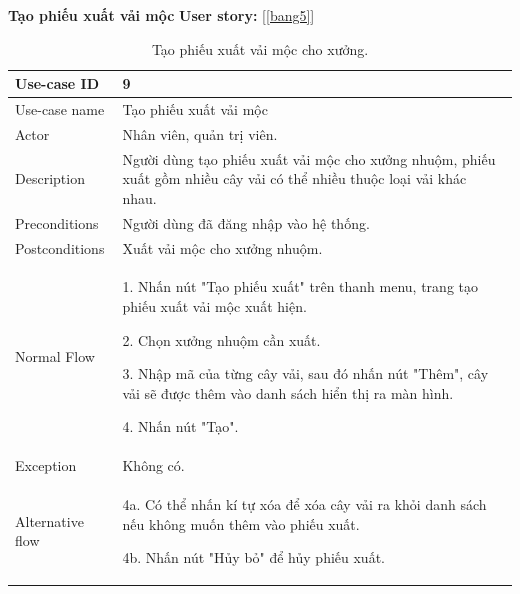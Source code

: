 \newpage
\textbf{Tạo phiếu xuất vải mộc}
\textbf{User story:} [\ref{bang5}]
\begin{table}[!htp]
    \centering
    \begin{tabular}{|m{3cm}|m{10cm}|}
    \hline 
        Use-case ID & 9\\ \hline
        Use-case name & Tạo phiếu xuất vải mộc\\ \hline
        Actor & Nhân viên, quản trị viên.\\ \hline
        Description & Người dùng tạo phiếu xuất vải mộc cho xưởng nhuộm, phiếu xuất gồm nhiều cây vải có thể nhiều thuộc loại vải khác nhau.\\ \hline
        Preconditions & Người dùng đã đăng nhập vào hệ thống.
        \\ \hline
        Postconditions & Xuất vải mộc cho xưởng nhuộm.\\ \hline
        Normal Flow & 
        1. Nhấn nút "Tạo phiếu xuất" trên thanh menu, trang tạo phiếu xuất vải mộc xuất hiện.\par
        2. Chọn xưởng nhuộm cần xuất.\par
        3. Nhập mã của từng cây vải, sau đó nhấn nút "Thêm", cây vải sẽ được thêm vào danh sách hiển thị ra màn hình.\par
        4. Nhấn nút "Tạo".
        \\ \hline
        Exception & Không có.
        \\ \hline
        Alternative flow & 
        4a. Có thể nhấn kí tự xóa để xóa cây vải ra khỏi danh sách nếu không muốn thêm vào phiếu xuất.\par
        4b. Nhấn nút "Hủy bỏ" để hủy phiếu xuất.
        \\ 
    \hline 
    \end{tabular}
    \caption{Tạo phiếu xuất vải mộc cho xưởng.}
    \label{bang9}
\end{table}

